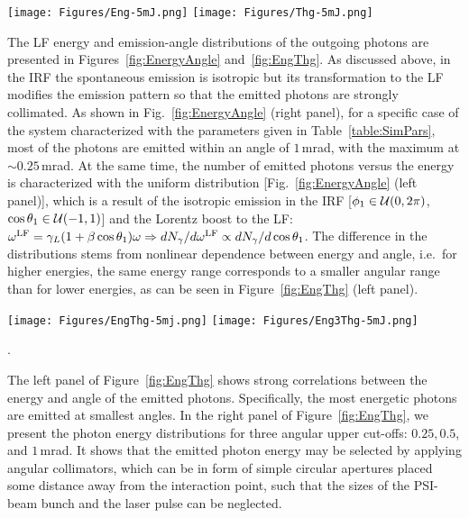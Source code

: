 \begin{figure*}[!htbp]
    \centering
    \texttt{[image: Figures/Eng-5mJ.png]}
    \texttt{[image: Figures/Thg-5mJ.png]}
    \caption{Distributions of energy (left) and polar angle (right) of the spontaneously emitted photons 
             from the H-like Pb bunch in the GF (in the LF).}
    \label{fig:EnergyAngle}
\end{figure*}

The LF energy and emission-angle distributions of the outgoing photons are presented in Figures~\ref{fig:EnergyAngle} and~\ref{fig:EngThg}.  As discussed above, in the IRF the spontaneous emission is isotropic but its transformation to the LF modifies the emission pattern so that the emitted photons are strongly collimated.  As shown in Fig.~\ref{fig:EnergyAngle} (right panel), for a specific case of the system characterized with the parameters given in Table~\ref{table:SimPars}, most of the photons are emitted within an angle of $1\,$mrad, with the maximum at $\sim 0.25\,$mrad.  At the same time, the number of emitted photons versus the energy is characterized with the uniform distribution [Fig.~\ref{fig:EnergyAngle} (left panel)], which is a result of the isotropic emission in the IRF [$\phi_1\in {\cal U}(0,2\pi)$, $\cos\theta_1 \in {\cal U}(-1,1)$] and the Lorentz boost to the LF: $\omega^{\rm LF} = \gamma_L(1+\beta\cos\theta_1)\omega \Rightarrow dN_{\gamma}/d\omega^{\rm LF} \propto dN_{\gamma}/d\cos\theta_1$.  The difference in the distributions stems from nonlinear dependence between energy and angle, i.e.\ for higher energies, the same energy range corresponds to a smaller angular range than for lower energies, as can be seen in Figure~\ref{fig:EngThg} (left panel).
\begin{figure*}[!htbp]
    \centering
    \texttt{[image: Figures/EngThg-5mj.png]}
    \texttt{[image: Figures/Eng3Thg-5mJ.png]}
    \caption{Distributions of energy versus polar angle (left) and energy for three angular upper cut-offs
             of the spontaneously emitted photons from the H-like Pb bunch in the GF (in the LF)}.
    \label{fig:EngThg}
\end{figure*}

The left panel of Figure~\ref{fig:EngThg} shows strong correlations between the energy and angle of the emitted photons. Specifically, the most energetic photons are emitted at smallest angles.  In the right panel of Figure~\ref{fig:EngThg}, we present the photon energy distributions for three angular upper cut-offs: $0.25, 0.5$, and $1\,$mrad.  It shows that the emitted photon energy may be selected by applying angular collimators,
which can be in form of simple circular apertures placed some distance away from the interaction point, such that the sizes of the PSI-beam bunch and the laser pulse can be neglected.  